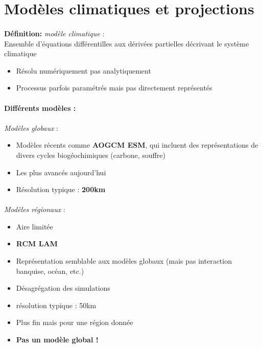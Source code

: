 \documentclass {article}
\begin{document}
\bigskip

\section{Modèles climatiques et projections}

\paragraph{}
\textbf{Définition:} \textit{modèle climatique} :
\\ Ensemble d'équations différentilles aux dérivées partielles décrivant le système climatique
\begin{itemize}
\item Résolu numériquement pas analytiquement
\item Processus parfois paramétrés mais pas directement représentés
\end{itemize}

\paragraph{}
\textbf{Différents modèles :} 

\paragraph{}
\textit{Modèles globaux} :
\begin{itemize}
\item Modèles récents comme \textbf{AOGCM ESM}, qui incluent des représentations de divers cycles biogéochimiques (carbone, souffre)
\item Les plus avancés aujourd'hui
\item Résolution typique : \textbf{200km}
\end{itemize}

\paragraph{}
\emph{Modèles régionaux} :
\begin{itemize}
\item Aire limitée
\item \textbf{RCM LAM}
\item Représentation semblable aux modèles globaux (mais pas interaction banquise, océan, etc.)
\item Désagrégation des simulations
\item résolution typique : 50km
\item Plus fin mais pour une région donnée
\item \textbf{Pas un modèle global !}
\end{itemize}
\end{document}

